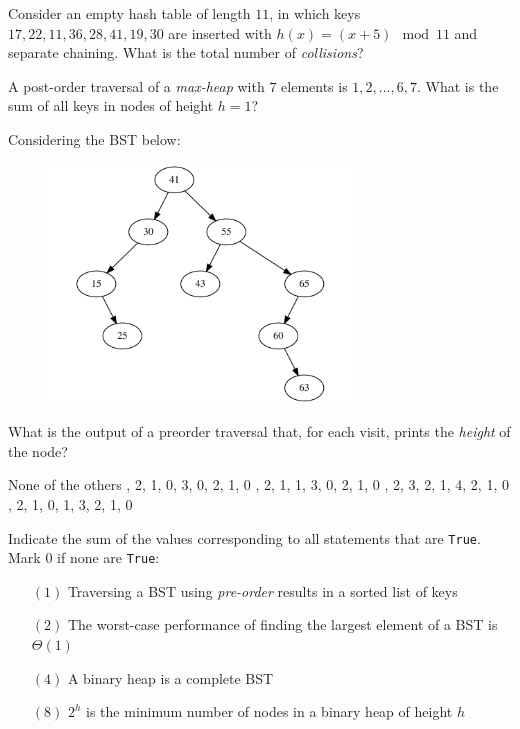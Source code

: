 \documentclass[12pt,addpoints]{exam}
\begin{document}
\pagebreak

\begin{questions}

\question[5] 
Consider an empty hash table of length $11$, in which keys $17,22,11,36,28,41,19,30$ are inserted with $h(x)=(x+5) \mod 11$ and separate chaining.  What is the total number of {\it collisions}?
\answerline

\question[5] 
A post-order traversal of a {\it max-heap} with $7$ elements is $1,2,\dots,6,7$.  What is the sum of all keys in nodes of height $h=1$?
\answerline

\question[5] Considering the BST below:
\begin{figure}[h!]
  \centering
  \includegraphics[height=2.5in]{imgs/bst.pdf}
\end{figure}

What is the output of a preorder traversal that, for each visit, prints the {\it height} of the node?
\begin{choices}	
	\choice None of the others	
	, 2, 1, 0, 3, 0, 2, 1, 0	
	, 2, 1, 1, 3, 0, 2, 1, 0	
	, 2, 3, 2, 1, 4, 2, 1, 0	
	, 2, 1, 0, 1, 3, 2, 1, 0
\end{choices}
\answerline

\question[5] 
Indicate the sum of the values corresponding to all statements that are \verb|True|.  Mark $0$ if none are \verb|True|:
\begin{itemize}
	\item[$(1)$] Traversing a BST using {\it pre-order} results in a sorted list of keys
	\item[$(2)$] The worst-case performance of finding the largest element of a BST is $\Theta(1)$
	\item[$(4)$] A binary heap is a complete BST
	\item[$(8)$] $2^h$ is the minimum number of nodes in a binary heap of height $h$\end{itemize}
\answerline


\end{questions}
\end{document}
